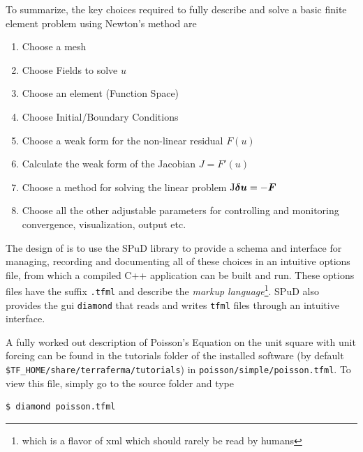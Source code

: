 To summarize,  the key choices required to fully describe and solve a
basic finite element problem using Newton's method are
\begin{enumerate}
\setlength{\itemsep}{0cm}
\item Choose a mesh
\item Choose Fields to solve $u$
\item Choose an element (Function Space)
\item Choose Initial/Boundary Conditions
\item Choose a weak form for the non-linear residual $F(u)$
\item Calculate the weak form of the Jacobian $J=F'(u)$
\item Choose a method for solving the linear problem $\mathrm{J}{\mbox{\boldmath$\delta u$}} = -{\mbox{\boldmath$F$}}$
\item Choose all the other adjustable parameters for controlling and
  monitoring convergence, visualization, output etc.
\end{enumerate}

The design of \TF{} is to use the SPuD library to provide a schema and interface
for managing, recording and documenting all of these choices in an
intuitive options file, from which a compiled C++ application can
be built and run.  These options files have the suffix \texttt{.tfml}
and describe the \emph{\TF{} markup language}\footnote{which is a
  flavor of  xml which should rarely  be read by humans}.  SPuD also provides the gui
\texttt{diamond} that reads and writes \texttt{tfml} files through an
intuitive interface.  

A fully worked out description of Poisson's Equation on the unit
square with unit forcing can be found in the tutorials folder of the
installed software (by default
\texttt{\${TF\_HOME}/share/terraferma/tutorials}) in
\texttt{poisson/simple/poisson.tfml}.  To view this file, simply go to
the source folder and type
\begin{lstlisting}[style=Bash]
$ diamond poisson.tfml
\end{lstlisting}

